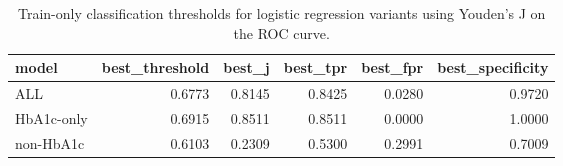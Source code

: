 \begin{table}[H]
\begin{center}
\begin{tabular}{lrrrrr}
\toprule
model & best_threshold & best_j & best_tpr & best_fpr & best_specificity \\
\midrule
ALL & 0.6773 & 0.8145 & 0.8425 & 0.0280 & 0.9720 \\
HbA1c-only & 0.6915 & 0.8511 & 0.8511 & 0.0000 & 1.0000 \\
non-HbA1c & 0.6103 & 0.2309 & 0.5300 & 0.2991 & 0.7009 \\
\bottomrule
\end{tabular}
\end{center}
\vspace{-5pt}
\caption{Train-only classification thresholds for logistic regression variants using Youden's J on the ROC curve.}
\label{tab:logit_thresholds_youden_train}
\end{table}
